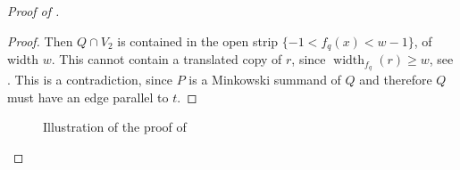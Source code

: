 \documentclass{amsart}
\theoremstyle{plain}
\theoremstyle{definition}
\newcommand{\width}{\operatorname{width}}
\newcommand{\Giulia}[1]{\todo[size=\tiny,inline,color=blue!30]{#1 \\ \hfill --- G.}}
\begin{document}
\begin{proof}[Proof of ]
\begin{proof}
Then $Q \cap V_2$ is contained in the open strip $\{-1<f_q(x)<w-1\}$, of width $w$. This cannot contain a translated copy of $r$, since $\width_{f_q}(r) \geq w$, see . This is a contradiction, since $P$ is a Minkowski summand of $Q$ and therefore $Q$ must have an edge parallel to $t$.
\end{proof}

\begin{figure}[htb]
\scalebox{.75}{}
\caption{Illustration of the proof of }
\label{fig:claim2}
\end{figure}

%
%
%
%
%
%
%
%
%
% 
%
%
%






\end{proof}
\end{document}
